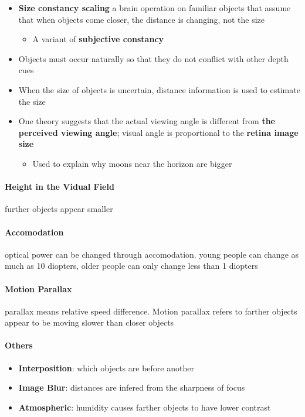  \begin{itemize}
    \item \textbf{Size constancy scaling} a brain operation on familiar objects
    that assume that when objects come closer, the distance is changing, not
    the size
    \begin{itemize}
      \item A variant of \textbf{subjective constancy}
    \end{itemize}

    \item Objects must occur naturally so that they do not conflict with other
    depth cues
    \item When the size of objects is uncertain, distance information is used
    to estimate the size
    \item One theory suggests that the actual viewing angle is different from
    \textbf{the perceived viewing angle}; visual angle is proportional to the
    \textbf{retina image size}
    \begin{itemize}
      \item Used to explain why moons near the horizon are bigger
    \end{itemize}
  \end{itemize}

  \paragraph{Height in the Vidual Field} further objects appear smaller

  \paragraph{Accomodation} optical power can be changed through accomodation.
  young people can change as much as 10 diopters, older people can only change
  less than 1 diopters

  \paragraph{Motion Parallax} parallax means relative speed difference.
  Motion parallax refers to farther objects appear to be moving slower than
  closer objects

  \paragraph{Others}
  \begin{itemize}
    \item \textbf{Interposition}: which objects are before another
    \item \textbf{Image Blur}: distances are infered from the sharpness of focus
    \item \textbf{Atmospheric}: humidity causes farther objects to have
    lower contrast
  \end{itemize}

